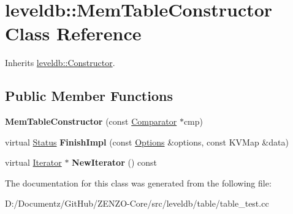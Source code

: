 \hypertarget{classleveldb_1_1_mem_table_constructor}{}\section{leveldb\+::Mem\+Table\+Constructor Class Reference}
\label{classleveldb_1_1_mem_table_constructor}


Inherits \mbox{\hyperlink{classleveldb_1_1_constructor}{leveldb\+::\+Constructor}}.

\subsection*{Public Member Functions}
\begin{DoxyCompactItemize}
\item 
\mbox{\label{classleveldb_1_1_mem_table_constructor_a5f4c341eb97e6e3938ec05b98455664a}} 
{\bfseries Mem\+Table\+Constructor} (const \mbox{\hyperlink{structleveldb_1_1_comparator}{Comparator}} $\ast$cmp)
\item 
\mbox{\label{classleveldb_1_1_mem_table_constructor_a78851e48bd187f231934e128ab050624}} 
virtual \mbox{\hyperlink{classleveldb_1_1_status}{Status}} {\bfseries Finish\+Impl} (const \mbox{\hyperlink{structleveldb_1_1_options}{Options}} \&options, const K\+V\+Map \&data)
\item 
\mbox{\label{classleveldb_1_1_mem_table_constructor_ab3f90c7f0c8f8b3b917ddf587290ff29}} 
virtual \mbox{\hyperlink{classleveldb_1_1_iterator}{Iterator}} $\ast$ {\bfseries New\+Iterator} () const
\end{DoxyCompactItemize}


The documentation for this class was generated from the following file\+:\begin{DoxyCompactItemize}
\item 
D\+:/\+Documentz/\+Git\+Hub/\+Z\+E\+N\+Z\+O-\/\+Core/src/leveldb/table/table\+\_\+test.\+cc\end{DoxyCompactItemize}
